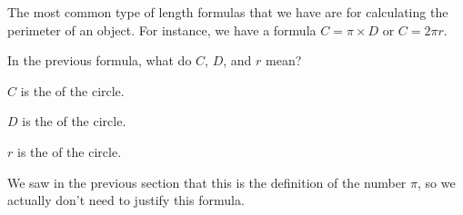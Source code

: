 \documentclass{ximera}
\begin{document}
The most common type of length formulas that we have are for calculating the perimeter of an object. For instance, we have a formula $C = \pi \times D$ or $C = 2 \pi r$.
\begin{question}
In the previous formula, what do $C$, $D$, and $r$ mean?

\begin{prompt}
$C$ is the  of the circle.

$D$ is the  of the circle. 

$r$ is the  of the circle. 
\end{prompt}
\end{question}
We saw in the previous section that this is the definition of the number $\pi$, so we actually don't need to justify this formula.
\end{document}
